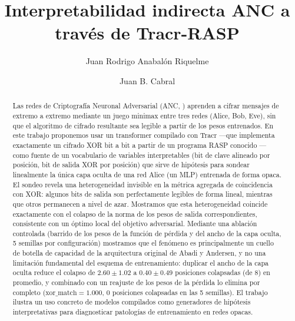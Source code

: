 \documentclass[manuscript,screen]{acmart}
\begin{document}
\title[Tracr para Diagnosticar ANC]{Interpretabilidad indirecta ANC a través de Tracr-RASP}

\author{Juan Rodrigo Anabalón Riquelme}

\author{Juan B. Cabral}

\renewcommand{\shortauthors}{Anabalón Riquelme and Cabral}

\begin{abstract}
Las redes de Criptografía Neuronal Adversarial (ANC, \citet{abadi2016learning}) aprenden a
cifrar mensajes de extremo a extremo mediante un juego minimax entre tres redes (Alice, Bob,
Eve), sin que el algoritmo de cifrado resultante sea legible a partir de los pesos entrenados.
En este trabajo proponemos usar un transformer compilado con Tracr
\citep{lindner2023tracr} —que implementa exactamente un cifrado XOR bit a bit a partir de un
programa RASP conocido \citep{weiss2021thinking}— como fuente de un vocabulario de variables
interpretables (bit de clave alineado por posición, bit de salida XOR por posición) que sirve
de hipótesis para sondear linealmente la única capa oculta de una red Alice (un MLP) entrenada
de forma opaca. El sondeo revela una heterogeneidad invisible en la métrica agregada de
coincidencia con XOR: algunos bits de salida son perfectamente legibles de forma lineal,
mientras que otros permanecen a nivel de azar. Mostramos que esta heterogeneidad coincide
exactamente con el colapso de la norma de los pesos de salida correspondientes, consistente
con un óptimo local del objetivo adversarial. Mediante una ablación controlada (barrido de los
pesos de la función de pérdida y del ancho de la capa oculta, 5 semillas por configuración)
mostramos que el fenómeno es principalmente un cuello de botella de capacidad de la
arquitectura original de Abadi y Andersen, y no una limitación fundamental del esquema de
entrenamiento: duplicar el ancho de la capa oculta reduce el colapso de $2.60\pm1.02$ a
$0.40\pm0.49$ posiciones colapsadas (de 8) en promedio, y combinado con un reajuste de los
pesos de la pérdida lo elimina por completo ($\text{xor\_match}=1.000$, 0 posiciones
colapsadas en las 5 semillas). El trabajo ilustra un uso concreto de modelos compilados como
generadores de hipótesis interpretativas para diagnosticar patologías de entrenamiento en
redes opacas.
\end{abstract}
\end{document}
